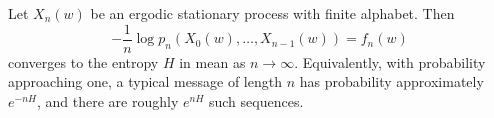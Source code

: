 Let $X_n(w)$ be an ergodic stationary process with finite alphabet. Then
$$-\frac{1}{n} \log p_n(X_0(w), \ldots, X_{n-1}(w)) = f_n(w)$$
converges to the entropy $H$ in mean as $n \to \infty$. Equivalently, with probability approaching one, a typical message of length $n$ has probability approximately $e^{-nH}$, and there are roughly $e^{nH}$ such sequences.
